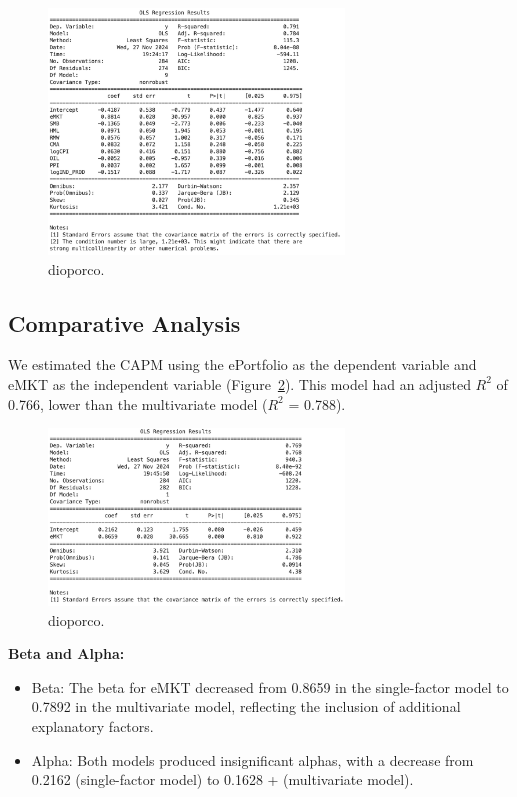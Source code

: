 \begin{figure}[h!]
    \centering
    \includegraphics[width=0.7\textwidth]{images/7_3.png}
    \caption{dioporco.}\label{fig:7_3}
\end{figure}

\subsection{Comparative Analysis}

We estimated the CAPM using the ePortfolio as the dependent variable and eMKT as the independent variable
(Figure~\ref{fig:7_4}).
This model had an adjusted $R^2$ of 0.766, lower than the multivariate model ($R^2$ = 0.788).

\begin{figure}[h!]
    \centering
    \includegraphics[width=0.7\textwidth]{images/7_4.png}
    \caption{dioporco.}\label{fig:7_4}
\end{figure}

\textbf{Beta and Alpha:}
\begin{itemize}
    \item Beta: The beta for eMKT decreased from 0.8659 in the single-factor model to 0.7892 in the multivariate model,
    reflecting the inclusion of additional explanatory factors.
    \item Alpha: Both models produced insignificant alphas, with a decrease from 0.2162 (single-factor model) to 0.1628 +
    (multivariate model).

\end{itemize}

